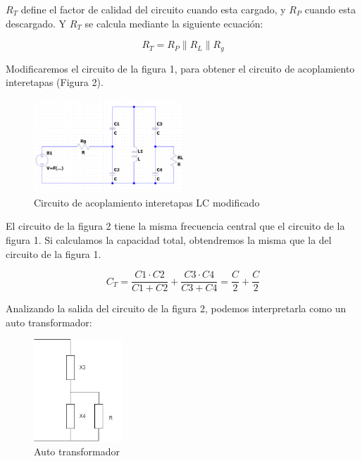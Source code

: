$R_T$ define el factor de calidad del circuito cuando esta cargado, y $R_P$ cuando esta descargado.
Y $R_T$ se calcula mediante la siguiente ecuación:

\begin{equation}
    R_T = R_P \parallel R_L \parallel R_g
\end{equation}

Modificaremos el circuito de la figura 1, para obtener el circuito de acoplamiento interetapas (Figura 2). 

\begin{figure}[h]
    \centering
    \includegraphics[width=0.5\textwidth]{Imagenes/circuito_acoplamiento2.png}
    \caption{Circuito de acoplamiento interetapas LC modificado}
\end{figure}

El circuito de la figura 2 tiene la misma frecuencia central que el circuito de la figura 1. Si calculamos la capacidad total, obtendremos la misma que la del circuito de la figura 1.

\begin{equation}
    C_T = \frac{C1 \cdot C2}{C1 + C2} + \frac{C3 \cdot C4}{C3 + C4} = \frac{C}{2} + \frac{C}{2} 
\end{equation}

Analizando la salida del circuito de la figura 2, podemos interpretarla como un auto transformador:

\begin{figure}[h]
    \centering
    \includegraphics[width=0.3\textwidth]{Imagenes/Esquema_autotrafo.png}
    \caption{Auto transformador}
\end{figure}


